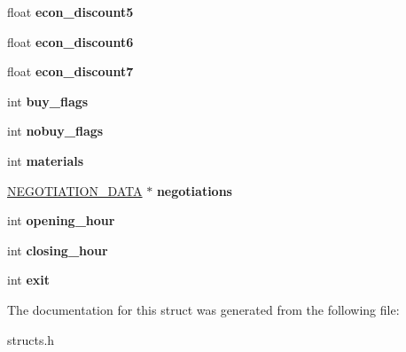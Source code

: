 \begin{DoxyCompactItemize}
\item 
\hypertarget{structshop__data_a87dd58d0dc91230f96d561d5d33b4b72}{float {\bfseries econ\-\_\-discount5}}\label{structshop__data_a87dd58d0dc91230f96d561d5d33b4b72}

\item 
\hypertarget{structshop__data_a0ab5e564dca3a9b1c1d75a07eaf3ecc1}{float {\bfseries econ\-\_\-discount6}}\label{structshop__data_a0ab5e564dca3a9b1c1d75a07eaf3ecc1}

\item 
\hypertarget{structshop__data_aacab1cf09335852d4855fd89c7004382}{float {\bfseries econ\-\_\-discount7}}\label{structshop__data_aacab1cf09335852d4855fd89c7004382}

\item 
\hypertarget{structshop__data_ac26e86529152a6835e4e72ac8715589b}{int {\bfseries buy\-\_\-flags}}\label{structshop__data_ac26e86529152a6835e4e72ac8715589b}

\item 
\hypertarget{structshop__data_a22ce6d6e9828d8de7a0015f4486c869e}{int {\bfseries nobuy\-\_\-flags}}\label{structshop__data_a22ce6d6e9828d8de7a0015f4486c869e}

\item 
\hypertarget{structshop__data_a57220105ccc23fd54df3fce11f7e0396}{int {\bfseries materials}}\label{structshop__data_a57220105ccc23fd54df3fce11f7e0396}

\item 
\hypertarget{structshop__data_a6533f81eb5c76904b1010f2a1712169d}{\hyperlink{structnegotiation__data}{N\-E\-G\-O\-T\-I\-A\-T\-I\-O\-N\-\_\-\-D\-A\-T\-A} $\ast$ {\bfseries negotiations}}\label{structshop__data_a6533f81eb5c76904b1010f2a1712169d}

\item 
\hypertarget{structshop__data_ae38c49cdd3f821de967f0a01faf4931b}{int {\bfseries opening\-\_\-hour}}\label{structshop__data_ae38c49cdd3f821de967f0a01faf4931b}

\item 
\hypertarget{structshop__data_a1b3f1f304596c9bfdacc03dfe9d840dd}{int {\bfseries closing\-\_\-hour}}\label{structshop__data_a1b3f1f304596c9bfdacc03dfe9d840dd}

\item 
\hypertarget{structshop__data_a3cbd2e02e5d001542c2bb35db9cbea60}{int {\bfseries exit}}\label{structshop__data_a3cbd2e02e5d001542c2bb35db9cbea60}

\end{DoxyCompactItemize}


The documentation for this struct was generated from the following file\-:\begin{DoxyCompactItemize}
\item 
structs.\-h\end{DoxyCompactItemize}
